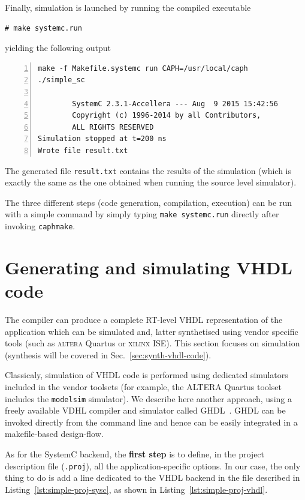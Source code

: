 \medskip
Finally, simulation is launched by running the compiled executable

\begin{lstlisting}[style=BashInputStyle]
# make systemc.run
\end{lstlisting}

yielding the following output 

\begin{lstlisting}[style=BashOutputStyle,numbers=left,numberstyle=\tiny]
make -f Makefile.systemc run CAPH=/usr/local/caph
./simple_sc

        SystemC 2.3.1-Accellera --- Aug  9 2015 15:42:56
        Copyright (c) 1996-2014 by all Contributors,
        ALL RIGHTS RESERVED
Simulation stopped at t=200 ns
Wrote file result.txt
\end{lstlisting}

The generated file \verb|result.txt| contains the results of the simulation (which is exactly the
same as the one obtained when running the source level simulator).

\medskip
The three different steps (code generation, compilation, execution) can be run with a simple command
by simply typing \verb|make systemc.run| directly after invoking \verb|caphmake|.

\section{Generating and  simulating VHDL code}
\label{sec:generating-vhdl}

The \caph compiler can produce a complete RT-level VHDL representation of the application which can
be simulated and, latter synthetised using vendor specific tools (such as \textsc{altera} Quartus or
\textsc{xilinx} ISE). This section focuses on simulation (synthesis will be covered in
Sec.~\ref{sec:synth-vhdl-code}). 

\medskip
Classicaly, simulation of VHDL code is performed using dedicated simulators included in the vendor
toolsets (for example, the ALTERA Quartus toolset includes the \texttt{modelsim} simulator). We
describe here another approach, using a freely available VDHL compiler and simulator called
GHDL~\cite{GHDL}. GHDL can be invoked directly from the command line and hence can be easily
integrated in a makefile-based design-flow.

\medskip As for the SystemC backend, the \textbf{first step} is to define, in the project
description file (\verb|.proj|), all the application-specific options. In our case, the only thing
to do is add a line dedicated to the VHDL backend in the file described in
Listing~\ref{lst:simple-proj-sysc}, as shown in Listing~\ref{lst:simple-proj-vhdl}. 

